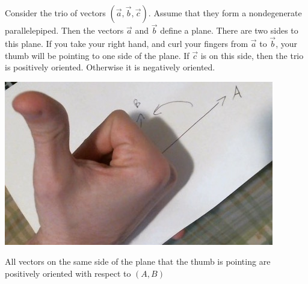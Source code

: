 \documentclass{ximera}
\begin{document}
	\begin{theorem}
	Consider the trio of vectors $(\vec{a},\vec{b},\vec{c})$.  Assume that they form a nondegenerate parallelepiped.  Then the vectors $\vec{a}$ and $\vec{b}$ define a plane.  There are two sides to this plane.  If you take your right hand, and curl your fingers from $\vec{a}$ to $\vec{b}$, your thumb will be pointing to one side of the plane.  If $\vec{c}$ is on this side, then the trio is positively oriented.  Otherwise it is negatively oriented.
		\begin{center}
		\includegraphics[width=3 in]{RHR.jpg}
		
		 All vectors on the same side of the plane that the thumb is pointing are positively oriented with respect to $(A,B)$
		\end{center}
	\end{theorem}
	
	
	
	
	
		
\end{document}
